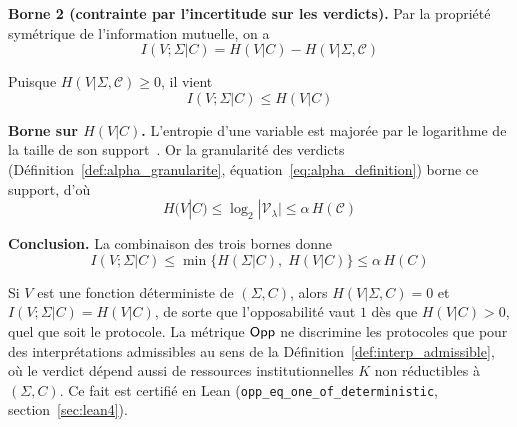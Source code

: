 \begin{sloppypar}
\begin{Preuve}
\textbf{Borne 2 (contrainte par l'incertitude sur les verdicts).}
Par la propri\'et\'e sym\'etrique de l'information mutuelle, on a
\begin{equation}
I(V;\Sigma|C) = H(V|C) - H(V|\Sigma,\mathcal{C})
\end{equation}

Puisque $H(V|\Sigma,\mathcal{C}) \geq 0$, il vient
\begin{equation}
I(V;\Sigma|C) \leq H(V|C)
\end{equation}

\textbf{Borne sur $H(V|C)$.}
L'entropie d'une variable est major\'ee par le logarithme de la taille de
son support~\cite{CoverThomas06}. Or la granularit\'e des verdicts
(D\'efinition~\ref{def:alpha_granularite},
\'equation~\eqref{eq:alpha_definition}) borne ce support, d'o\`u
\begin{equation}
H(V|C) \leq \log_2 |\mathcal{V}_\lambda| \leq \alpha\, H(\mathcal{C})
\end{equation}

\textbf{Conclusion.}
La combinaison des trois bornes donne
\begin{equation}
I(V;\Sigma|C) \leq \min\{H(\Sigma|C),\; H(V|C)\} \leq \alpha\, H(C)
\end{equation}
\end{Preuve}

\begin{remark}\label{rem:verdict_deterministe}
Si $V$ est une fonction d\'eterministe de $(\Sigma,C)$, alors
$H(V|\Sigma,C)=0$ et $I(V;\Sigma|C)=H(V|C)$, de sorte que l'opposabilit\'e vaut $1$
d\`es que $H(V|C)>0$, quel que soit le protocole. La m\'etrique $\mathsf{Opp}$ ne
discrimine les protocoles que pour des interpr\'etations admissibles au sens
de la D\'efinition~\ref{def:interp_admissible}, o\`u le verdict d\'epend
aussi de ressources institutionnelles $K$ non r\'eductibles \`a $(\Sigma,C)$.
Ce fait est certifi\'e en Lean (\texttt{opp\_eq\_one\_of\_deterministic},
section~\ref{sec:lean4}).
\end{remark}


\end{sloppypar}
